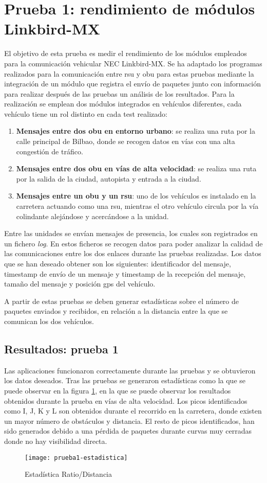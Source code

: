 \section{Prueba 1: rendimiento de módulos Linkbird-MX}
El objetivo de esta prueba es medir el rendimiento de los módulos empleados
para la comunicación vehicular NEC Linkbird-MX. Se ha adaptado los programas
realizados para la comunicación entre \gls{rsu} y \gls{obu} para estas pruebas
mediante la integración de un módulo que registra el envío de paquetes junto
con información para realizar después de las pruebas un análisis de los
resultados. Para la realización se emplean dos módulos integrados en vehículos
diferentes, cada vehículo tiene un rol distinto en cada test realizado:

\begin{enumerate}
	\item \textbf{Mensajes entre dos \gls{obu} en entorno urbano}: se realiza
	una ruta por la calle principal de Bilbao, donde se recogen datos en vías con
	una alta congestión de tráfico.

	\item \textbf{Mensajes entre dos \gls{obu} en vías de alta velocidad}: se
	realiza una ruta por la salida de la ciudad, autopista y entrada a la ciudad.

	\item \textbf{Mensajes entre un \gls{obu} y un \gls{rsu}}: uno de los
	vehículos es instalado en la carretera actuando como una \gls{rsu}, mientras
	el otro vehículo circula por la vía colindante alejándose y	acercándose a la
	unidad.
\end{enumerate}

Entre las unidades se envían mensajes de presencia, los cuales son registrados
en un fichero \emph{log}. En estos ficheros se recogen datos para poder
analizar la calidad de las comunicaciones entre los dos enlaces durante las
pruebas realizadas. Los datos que se han deseado obtener son los siguientes:
identificador del mensaje, timestamp de envío de un mensaje y timestamp de la
recepción del mensaje, tamaño del mensaje y posición \gls{gps} del vehículo.

A partir de estas pruebas se deben generar estadísticas sobre el número de
paquetes enviados y recibidos, en relación a la distancia entre la que se
comunican los dos vehículos.

\subsection{Resultados: prueba 1}
Las aplicaciones funcionaron correctamente durante las pruebas y se obtuvieron
los datos deseados. Tras las pruebas se generaron estadísticas como la que se
puede observar en la figura \ref{fig:prueba1}, en la que se puede observar los
resultados obtenidos durante la prueba en vías de alta velocidad. Los picos
identificados como I, J, K y L son obtenidos durante el recorrido en la
carretera, donde existen un mayor número de obstáculos y distancia. El resto
de picos identificados, han sido generados debido a una pérdida de paquetes
durante curvas muy cerradas donde no hay visibilidad directa.

\begin{figure}[H]
	\begin{center}
		\texttt{[image: prueba1-estadistica]}
		\caption{Estadística Ratio/Distancia}
		\label{fig:prueba1}
	\end{center}
\end{figure}
